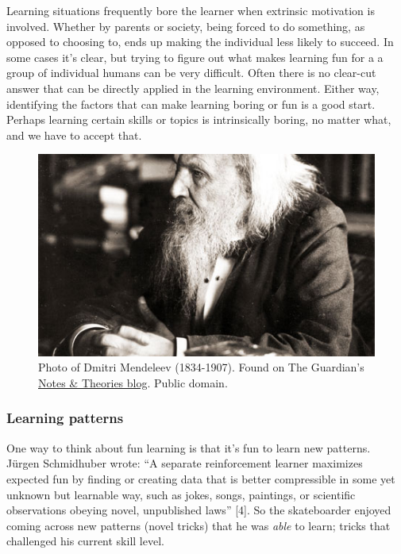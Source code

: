 Learning situations frequently bore the learner when extrinsic
motivation is involved. Whether by parents or society, being forced to
do something, as opposed to choosing to, ends up making the individual
less likely to succeed. In some cases it's clear, but trying to figure
out what makes learning fun for a a group of individual humans can be
very difficult. Often there is no clear-cut answer that can be directly
applied in the learning environment. Either way, identifying the factors
that can make learning boring or fun is a good start. Perhaps learning
certain skills or topics is intrinsically boring, no matter what, and we
have to accept that.

\begin{figure}
\begin{center}
\includegraphics[width=.8\textwidth]{../pictures/mendeleev.jpg}
\caption{Photo of Dmitri Mendeleev (1834-1907). Found on The Guardian's \href{http://www.guardian.co.uk/science/blog/2011/dec/07/dmitri-mendeleev-business-card}{Notes \& Theories blog}. Public domain.}
\end{center}
\end{figure}


\subsubsection{Learning patterns}

One way to think about fun learning is that it's fun to learn new
patterns. Jürgen Schmidhuber wrote: ``A separate reinforcement learner
maximizes expected fun by finding or creating data that is better
compressible in some yet unknown but learnable way, such as jokes,
songs, paintings, or scientific observations obeying novel, unpublished
laws'' {[}4{]}. So the skateboarder enjoyed coming across new patterns
(novel tricks) that he was \emph{able} to learn; tricks that challenged
his current skill level.

